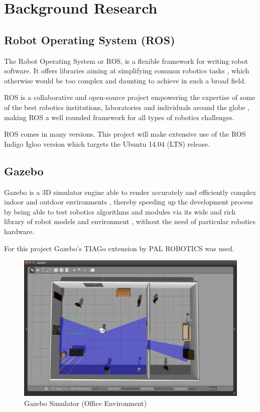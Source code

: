 \chapter{Background Research}
\label{chapter2}

\section{Robot Operating System (ROS)}

The Robot Operating System or ROS, is a flexible framework for writing robot software. It offers libraries aiming at simplifying common robotics tasks \cite{website:aboutROS}, which otherwise would be too complex and daunting to achieve in such a broad field.

ROS is a collaborative and open-source project empowering the expertise of some of the best robotics institutions, laboratories and individuals around the globe \cite{website:aboutROS}, making ROS a well rounded framework for all types of robotics challenges. 

ROS comes in many versions. This project will make extensive use of the ROS Indigo Igloo version which targets the Ubuntu 14.04 (LTS) release.

\section{Gazebo}

Gazebo is a 3D simulator engine able to render accurately and efficiently complex indoor and outdoor environments \cite{website:Gazebo}, thereby speeding up the development process by being able to test robotics algorithms and modules via its wide and rich library of robot models and environment \cite{website:Gazebo}, without the need of particular robotics hardware.

For this project Gazebo's TIAGo extension by PAL ROBOTICS was used.

\begin{figure}[!htbp]
\begin{center}
\includegraphics[width=\linewidth]{images/chapter2_gazebo_screenshot1.png}
\end{center}
\caption{Gazebo Simulator (Office Environment)}
\label{fig:gazebo_screenshot1}
\end{figure}

